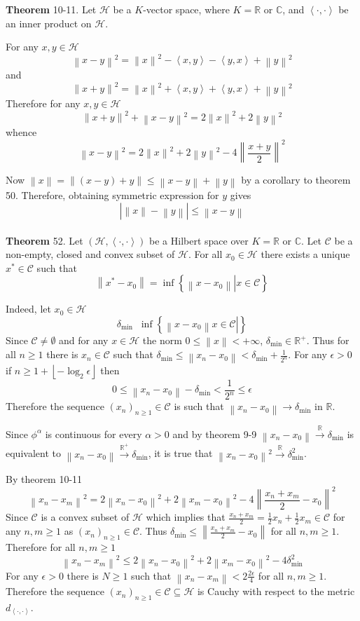 \documentclass[a4paper]{article}
\newcommand{\obj}[1]{\left\{ #1 \right \}}
\newcommand{\brac}[1]{\left ( #1 \right )}
\newcommand{\induc}[1]{\left . #1 \right \vert}
\newcommand{\abs}[1]{\left | #1 \right |}
\newcommand{\nrm}[1]{\left\| #1 \right \|}
\newcommand{\brkt}[1]{\left\langle #1 \right\rangle}
\newcommand{\floor}[1]{\left\lfloor #1 \right\rfloor}
\newcommand{\Real}{\mathbb{R}}
\newcommand{\Cplx}{\mathbb{C}}
\newcommand{\Hcal}{\mathcal{H}}
\newcommand{\Ccal}{\mathcal{C}}
\newcommand{\defn}{\mathop{\overset{\Delta}{=}}\nolimits}
\begin{document}
\label{thm:inner_product_properties} \noindent \textbf{Theorem} 10-11.
Let $\Hcal$ be a $K$-vector space, where $K=\Real$ or $\Cplx$, and $\brkt{\cdot,\cdot}$ be an inner product on $\Hcal$.

For any $x,y\in \Hcal$ \[\nrm{x-y}^2 = \nrm{x}^2 - \brkt{x,y} - \brkt{y,x} + \nrm{y}^2\] and \[\nrm{x+y}^2 = \nrm{x}^2 + \brkt{x,y} + \brkt{y,x} + \nrm{y}^2\] Therefore for any $x,y\in \Hcal$ \[\nrm{x+y}^2+\nrm{x-y}^2 = 2\nrm{x}^2 + 2\nrm{y}^2 \] whence \[\nrm{x-y}^2 = 2\nrm{x}^2 + 2\nrm{y}^2 - 4\nrm{\frac{x+y}{2}}^2\]

Now $\nrm{x} = \nrm{\brac{x-y}+y}\leq \nrm{x-y}+\nrm{y}$ by a corollary to theorem 50. Therefore, obtaining symmetric expression for $y$ gives \[\abs{\nrm{x}-\nrm{y}}\leq \nrm{x-y}\]\\

\label{thm:convex_projection} \noindent \textbf{Theorem} 52.
Let $\brac{\Hcal, \brkt{\cdot, \cdot}}$ be a Hilbert space over $K=\Real$ or $\Cplx$. Let $\Ccal$ be a non-empty, closed and convex subset of $\Hcal$. For all $x_0\in \Hcal$ there exists a unique $x^*\in \Ccal$ such that \[\nrm{x^*-x_0} = \inf\obj{ \induc{ \nrm{x - x_0} } x\in \Ccal }\]

Indeed, let $x_0\in \Hcal$ \[\delta_{\text{min}}\defn \inf\obj{ \induc{ \nrm{x - x_0} x\in \Ccal } }\] Since $\Ccal\neq \emptyset$ and for any $x\in \Hcal$ the norm $0\leq \nrm{x}<+\infty$, $\delta_{\text{min}}\in \Real^+$. Thus for all $n\geq 1$ there is $x_n\in \Ccal$ such that $\delta_{\text{min}}\leq \nrm{x_n-x_0}<\delta_{\text{min}}+\frac{1}{2^n}$. For any $\epsilon>0$ if $n\geq 1+\floor{-\log_2{\epsilon}}$ then \[0\leq \nrm{x_n-x_0}-\delta_{\text{min}}<\frac{1}{2^n}\leq\epsilon\] Therefore the sequence $\brac{x_n}_{n\geq 1}\in \Ccal$ is such that $\nrm{x_n-x_0}\to \delta_{\text{min}}$ in $\Real$.

Since $\phi^\alpha$ is continuous for every $\alpha > 0$ and by theorem 9-9 $\nrm{x_n-x_0}\overset{\Real}{\to}\delta_{\text{min}}$ is equivalent to $\nrm{x_n-x_0}\overset{\Real^+}{\to}\delta_{\text{min}}$, it is true that $\nrm{x_n-x_0}^2\overset{\Real}{\to}\delta_{\text{min}}^2$.

By theorem 10-11 \[\nrm{x_n-x_m}^2 = 2\nrm{x_n-x_0}^2 + 2\nrm{x_m-x_0}^2 - 4\nrm{\frac{x_n+x_m}{2}-x_0}^2\] Since $\Ccal$ is a convex subset of $\Hcal$ which implies that $\frac{x_n+x_m}{2} = \frac{1}{2}x_n + \frac{1}{2}x_m \in \Ccal$ for any $n,m\geq 1$ as $\brac{x_n}_{n\geq 1}\in \Ccal$. Thus $\delta_{\text{min}}\leq \nrm{\frac{x_n+x_m}{2} - x_0}$ for all $n,m \geq 1$.
Therefore for all $n,m\geq 1$ \[\nrm{x_n-x_m}^2\leq 2\nrm{x_n-x_0}^2 + 2\nrm{x_m-x_0}^2 - 4\delta_{\text{min}}^2\] For any $\epsilon>0$ there is $N\geq 1$ such that $\nrm{x_n-x_m} < 2\frac{2 \epsilon}{4}$ for all $n,m\geq 1$. Therefore the sequence $\brac{x_n}_{n\geq 1}\in \Ccal\subseteq \Hcal$ is Cauchy with respect to the metric $d_{\brkt{\cdot,\cdot}}$.
\end{document}
